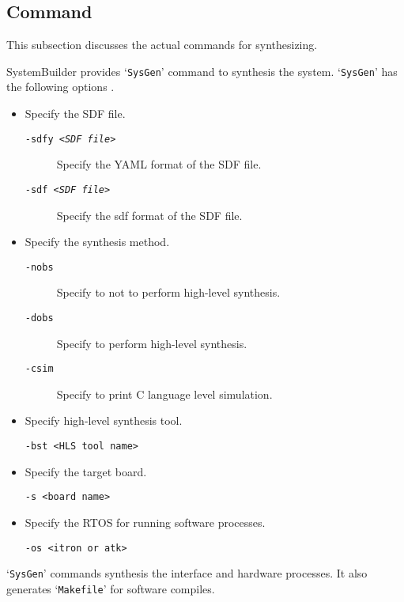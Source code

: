 \subsection{Command} \label{sec:command}
This subsection discusses the actual commands for synthesizing.

SystemBuilder provides `\texttt{SysGen}' command to synthesis the system. `\texttt{SysGen}' has the following options \cite{man:systembuilder}.

\begin{itemize}
  \item Specify the SDF file.
    \begin{description}
      \item[\texttt{-sdfy \textit{<SDF file>}}] Specify the YAML format of the SDF file.
      \item[\texttt{-sdf \;\;\textit{<SDF file>}}] Specify the sdf format of the SDF file.
    \end{description}
  \item Specify the synthesis method.
    \begin{description}
      \item[\texttt{-nobs}] Specify to not to perform high-level synthesis.
      \item[\texttt{-dobs}] Specify to perform high-level synthesis.
      \item[\texttt{-csim}] Specify to print C language level simulation.
    \end{description}
  \item Specify high-level synthesis tool.
    \begin{description}
      \item[\texttt{-bst <HLS tool name>}]
    \end{description}
  \item Specify the target board.
    \begin{description}
      \item[\texttt{-s <board name>}]
    \end{description}
  \item Specify the RTOS for running software processes.
    \begin{description}
      \item[\texttt{-os <itron or atk>}]
    \end{description}
  \end{itemize}

  `\texttt{SysGen}' commands synthesis the interface and hardware processes. It also generates `\texttt{Makefile}' for software compiles.


